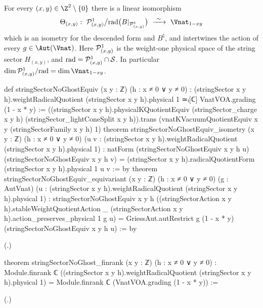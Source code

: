 \begin{theorem}\label{ch18:thm:noghost}
For every $(x,y)\in\Z^2\setminus\{0\}$ there is a linear isomorphism
\begin{equation*}
  \Theta_{(x,y)}:\ \chXVIIIP^1_{(x,y)}\big/\mathrm{rad}\bigl(B|_{\chXVIIIP^1_{(x,y)}}\bigr)\ \xrightarrow{\ \sim\ }\ \Vnat_{1-xy}
\end{equation*}
which is an isometry for the descended form and $B^\natural$, and intertwines the action of every
$g\in\Aut(\Vnat)$.  Here $\mathcal{P}^1_{(x,y)}$ is the weight-one physical space of the string sector $H_{(x,y)}$, and
$\mathrm{rad}=\mathcal{P}^1_{(x,y)}\cap\mathcal{S}$.  In particular $\dim\chXVIIIP^1_{(x,y)}/\mathrm{rad}=\dim\Vnat_{1-xy}$.
\end{theorem}
\begin{leancode}
def stringSectorNoGhostEquiv (x y : ℤ) (h : x ≠ 0 ∨ y ≠ 0) :
    (stringSector x y h).weightRadicalQuotient (stringSector x y h).physical 1 ≃ₗ[ℂ]
      VnatVOA.grading (1 - x * y) :=
  ((stringSector x y h).physicalKQuotientEquiv (stringSector_charge x y h)
    (stringSector_lightConeSplit x y h)).trans
      (vnatKVacuumQuotientEquiv x y (stringSectorFamily x y h) 1)
theorem stringSectorNoGhostEquiv_isometry (x y : ℤ) (h : x ≠ 0 ∨ y ≠ 0)
    (u v : (stringSector x y h).weightRadicalQuotient (stringSector x y h).physical 1) :
    natForm (stringSectorNoGhostEquiv x y h u) (stringSectorNoGhostEquiv x y h v) =
      (stringSector x y h).radicalQuotientForm (stringSector x y h).physical 1 u v := by
theorem stringSectorNoGhostEquiv_equivariant (x y : ℤ) (h : x ≠ 0 ∨ y ≠ 0)
    (g : AutVnat)
    (u : (stringSector x y h).weightRadicalQuotient (stringSector x y h).physical 1) :
    stringSectorNoGhostEquiv x y h
      ((stringSectorAction x y h).stableWeightQuotientAction _
        (stringSectorAction x y h).action_preserves_physical 1 g u) =
      GriessAut.autRestrict g (1 - x * y) (stringSectorNoGhostEquiv x y h u) := by
\end{leancode}
(.)
\begin{leancode}
theorem stringSectorNoGhost_finrank (x y : ℤ) (h : x ≠ 0 ∨ y ≠ 0) :
    Module.finrank ℂ
      ((stringSector x y h).weightRadicalQuotient (stringSector x y h).physical 1) =
      Module.finrank ℂ (VnatVOA.grading (1 - x * y)) :=
\end{leancode}
(.)

